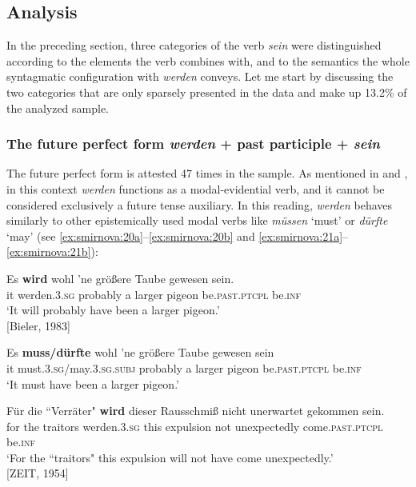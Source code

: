 \documentclass[output=paper,colorlinks,citecolor=brown]{langscibook}
\begin{document}
\subsection{Analysis} \label{sec:smirnova:4.2}
In the preceding section, three categories of the verb \emph{sein} were distinguished according to the elements the verb combines with, and to the semantics the whole syntagmatic configuration with \emph{werden} conveys. Let me start by discussing the two categories that are only sparsely presented in the data and make up 13.2\% of the analyzed sample. 
\subsubsection{The future perfect form \emph{werden} + past participle + \emph{sein}} \label{sec:smirnova:4.2.1}

\largerpage[1]

\par The future perfect form is attested 47 times in the sample. As mentioned in  and , in this context \emph{werden} functions as a modal-evidential verb, and it cannot be considered exclusively a future tense auxiliary. In this reading, \emph{werden} behaves similarly to other epistemically used modal verbs like \emph{müssen} `must' or \emph{dürfte} `may' (see \ref{ex:smirnova:20a}--\ref{ex:smirnova:20b} and \ref{ex:smirnova:21a}--\ref{ex:smirnova:21b}):

\ea \label{ex:smirnova:20}
\ea \label{ex:smirnova:20a}
\gll Es \textbf{wird} wohl 'ne größere Taube gewesen sein.\\
    it werden.\textsc{3.sg} probably a larger pigeon be.\textsc{past.ptcpl} be.\textsc{inf} \\
\glt `It will probably have been a larger pigeon.'\\
\hfill [Bieler, 1983]

\ex \label{ex:smirnova:20b}
\gll Es \textbf{muss/dürfte} wohl 'ne größere Taube gewesen sein \\
it must.\textsc{3.sg}/may.\textsc{3.sg.subj} probably a larger pigeon be.\textsc{past.ptcpl} be.\textsc{inf} \\
\glt `It must have been a larger pigeon.'
    \z
\z

\ea \label{ex:smirnova:21}
\ea \label{ex:smirnova:21a}
\gll Für die ``Verräter" \textbf{wird} dieser Rausschmiß nicht unerwartet gekommen sein.\\
    for the traitors werden.\textsc{3.sg} this expulsion not unexpectedly come.\textsc{past.ptcpl} be.\textsc{inf} \\
\glt `For the ``traitors" this expulsion will not have come unexpectedly.'\\
\hfill [ZEIT, 1954]
\end{document}
